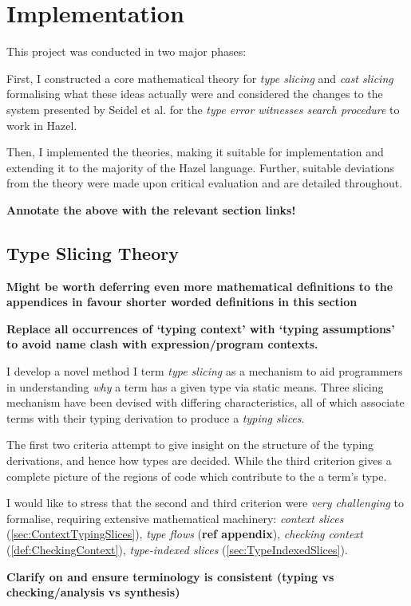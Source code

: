 \chapter{Implementation}\label{chap:Implementation}
This project was conducted in two major phases:

First, I constructed a core mathematical theory for \textit{type slicing} and \textit{cast slicing} formalising what these ideas actually were and considered the changes to the system presented by Seidel et al. for the \textit{type error witnesses search procedure} to work in Hazel.  

Then, I implemented the theories, making it suitable for implementation and extending it to the majority of the Hazel language. Further, suitable deviations from the theory were made upon critical evaluation and are detailed throughout.

\textbf{Annotate the above with the relevant section links!}
\section{Type Slicing Theory}\label{sec:TypeSlicingTheory}
\textbf{Might be worth deferring even more mathematical definitions to the appendices in favour shorter worded definitions in this section}

\textbf{Replace all occurrences of `typing context' with `typing assumptions' to avoid name clash with expression/program contexts.}

I develop a novel method I term \textit{type slicing} as a mechanism to aid programmers in understanding \textit{why} a term has a given type via static means. Three slicing mechanism have been devised with differing characteristics, all of which associate terms with their typing derivation to produce a \textit{typing slices}. 

The first two criteria attempt to give insight on the structure of the typing derivations, and hence how types are decided. While the third criterion gives a complete picture of the regions of code which contribute to the a term's type.

I would like to stress that the second and third criterion were \textit{very challenging} to formalise, requiring extensive mathematical machinery: \textit{context slices} (\cref{sec:ContextTypingSlices}), \textit{type flows} (\textbf{ref appendix}), \textit{checking context} (\cref{def:CheckingContext}), \textit{type-indexed slices} (\cref{sec:TypeIndexedSlices}).

\textbf{Clarify on and ensure terminology is consistent (typing vs checking/analysis vs synthesis)}

